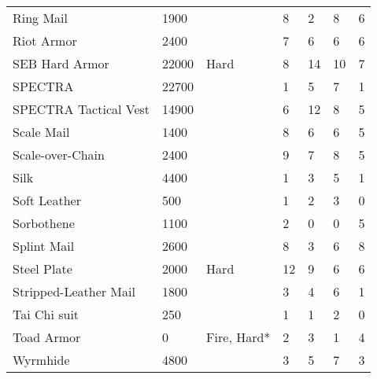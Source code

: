 \documentclass[twoside]{book}
\begin{document}
\begin{longtable}{p{1.25in}llp{2em}p{2em}p{2em}p{2em}}
  \raggedright
           Ring Mail 
  &
   1900 
  &
  
  &
   8 
  &
   2 
  &
   8 
  &
   6 
  \tabularnewline
      
  \raggedright
           Riot Armor 
  &
   2400 
  &
  
  &
   7 
  &
   6 
  &
   6 
  &
   6 
  \tabularnewline
      
  \raggedright
           SEB Hard Armor 
  &
   22000 
  &
   Hard 
  &
   8 
  &
   14 
  &
   10 
  &
   7 
  \tabularnewline
      
  \raggedright
           SPECTRA 
  &
   22700 
  &
  
  &
   1 
  &
   5 
  &
   7 
  &
   1 
  \tabularnewline
      
  \raggedright
           SPECTRA Tactical Vest 
  &
   14900 
  &
  
  &
   6 
  &
   12 
  &
   8 
  &
   5 
  \tabularnewline
      
  \raggedright
           Scale Mail 
  &
   1400 
  &
  
  &
   8 
  &
   6 
  &
   6 
  &
   5 
  \tabularnewline
      
  \raggedright
           Scale-over-Chain 
  &
   2400 
  &
  
  &
   9 
  &
   7 
  &
   8 
  &
   5 
  \tabularnewline
      
  \raggedright
           Silk 
  &
   4400 
  &
  
  &
   1 
  &
   3 
  &
   5 
  &
   1 
  \tabularnewline
      
  \raggedright
           Soft Leather 
  &
   500 
  &
  
  &
   1 
  &
   2 
  &
   3 
  &
   0 
  \tabularnewline
      
  \raggedright
           Sorbothene 
  &
   1100 
  &
  
  &
   2 
  &
   0 
  &
   0 
  &
   5 
  \tabularnewline
      
  \raggedright
           Splint Mail 
  &
   2600 
  &
  
  &
   8 
  &
   3 
  &
   6 
  &
   8 
  \tabularnewline
      
  \raggedright
           Steel Plate 
  &
   2000 
  &
   Hard 
  &
   12 
  &
   9 
  &
   6 
  &
   6 
  \tabularnewline
      
  \raggedright
           Stripped-Leather Mail 
  &
   1800 
  &
  
  &
   3 
  &
   4 
  &
   6 
  &
   1 
  \tabularnewline
      
  \raggedright
           Tai Chi suit 
  &
   250 
  &
  
  &
   1 
  &
   1 
  &
   2 
  &
   0 
  \tabularnewline
      
  \raggedright
           Toad Armor 
  &
   0 
  &
   Fire, Hard* 
  &
   2 
  &
   3 
  &
   1 
  &
   4 
  \tabularnewline
      
  \raggedright
           Wyrmhide 
  &
   4800 
  &
  
  &
   3 
  &
   5 
  &
   7 
  &
   3 
  \tabularnewline
      
\end{longtable}
    
\end{document}
